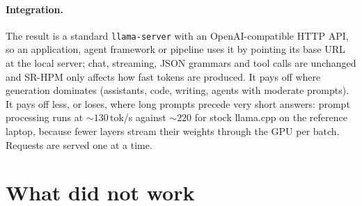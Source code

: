 \documentclass[10pt]{article}
\newcommand{\tps}{tok/s}
\begin{document}
\paragraph{Integration.} The result is a standard \texttt{llama-server} with an OpenAI-compatible HTTP API, so an
application, agent framework or pipeline uses it by pointing its base URL at the local server; chat, streaming, JSON
grammars and tool calls are unchanged and SR-HPM only affects how fast tokens are produced. It pays off where
generation dominates (assistants, code, writing, agents with moderate prompts). It pays off less, or loses, where long
prompts precede very short answers: prompt processing runs at ${\sim}130$\,\tps{} against ${\sim}220$ for stock
llama.cpp on the reference laptop, because fewer layers stream their weights through the GPU per batch. Requests are
served one at a time.

\section{What did not work}\label{sec:negative}
\end{document}

